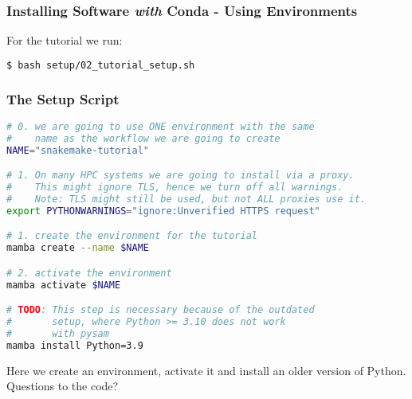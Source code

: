 \begin{frame}[fragile]
  \frametitle{Installing Software \emph{with} Conda - Using Environments}
  For the tutorial we run:
  \begin{lstlisting}[language=Bash, style=Shell]
$ bash setup/02_tutorial_setup.sh
  \end{lstlisting}
\end{frame}

\begin{frame}[fragile]
  \frametitle{The Setup Script}
  \begin{lstlisting}[language=Bash, style=Shell, basicstyle=\tiny]
# 0. we are going to use ONE environment with the same
#    name as the workflow we are going to create
NAME="snakemake-tutorial"

# 1. On many HPC systems we are going to install via a proxy.
#    This might ignore TLS, hence we turn off all warnings.
#    Note: TLS might still be used, but not ALL proxies use it.
export PYTHONWARNINGS="ignore:Unverified HTTPS request"

# 1. create the environment for the tutorial
mamba create --name $NAME

# 2. activate the environment
mamba activate $NAME

# TODO: This step is necessary because of the outdated 
#       setup, where Python >= 3.10 does not work
#       with pysam
mamba install Python=3.9
  \end{lstlisting}
  Here we create an environment, activate it and install an older version of Python. Questions to the code?
\end{frame}

